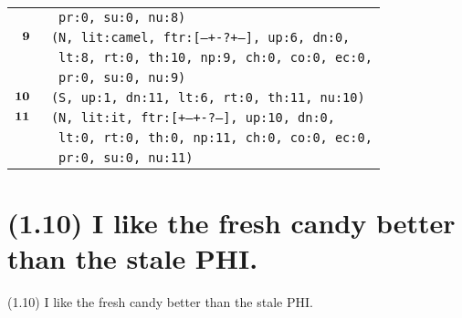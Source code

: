 \documentclass{article}
\begin{document}
\begin{minipage}{\textwidth}
{\begin{tabular}{|r|l|}
    & \texttt{\texttt{~pr:0,~su:0,~nu:8)}} \\
    ${\textbf{\textrm{9}}_{\phantom{z}}}$ & \texttt{\texttt{(N,~lit:camel,~ftr:[---+-?+--],~up:6,~dn:0,}} \\
    & \texttt{\texttt{~lt:8,~rt:0,~th:10,~np:9,~ch:0,~co:0,~ec:0,}} \\
    & \texttt{\texttt{~pr:0,~su:0,~nu:9)}} \\
    ${\textbf{\textrm{10}}_{\phantom{z}}}$ & \texttt{\texttt{(S,~up:1,~dn:11,~lt:6,~rt:0,~th:11,~nu:10)}} \\
    ${\textbf{\textrm{11}}_{\phantom{z}}}$ & \texttt{\texttt{(N,~lit:it,~ftr:[+--+-?---],~up:10,~dn:0,}} \\
    & \texttt{\texttt{~lt:0,~rt:0,~th:0,~np:11,~ch:0,~co:0,~ec:0,}} \\
    & \texttt{\texttt{~pr:0,~su:0,~nu:11)}} \\
    \hline
  \end{tabular}
  }
\end{minipage}
\bigbreak

\clearpage

%
%

\section*{(1.10) I like the fresh candy better than the stale PHI.}

\bigbreak
\begin{enumerate*}
\item[(1.10)] I like the fresh candy better than the stale PHI.
\end{enumerate*}
\bigbreak
\end{document}
